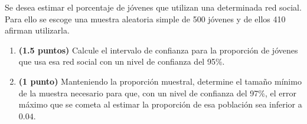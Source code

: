
Se desea estimar el porcentaje de jóvenes que utilizan una determinada red social. Para ello se escoge una muestra aleatoria simple de 500 jóvenes y de ellos 410 afirman utilizarla.
\begin{enumerate}[label=\alph*)]
\item \textbf{(1.5 puntos)} Calcule el intervalo de confianza para la proporción de jóvenes que usa esa red social con un nivel de confianza del 95\%.
\item \textbf{(1 punto)} Manteniendo la proporción muestral, determine el tamaño mínimo de la muestra necesario para que, con un nivel de confianza del 97\%, el error máximo que se cometa al estimar la proporción de esa población sea inferior a $0.04$.
\end{enumerate}
